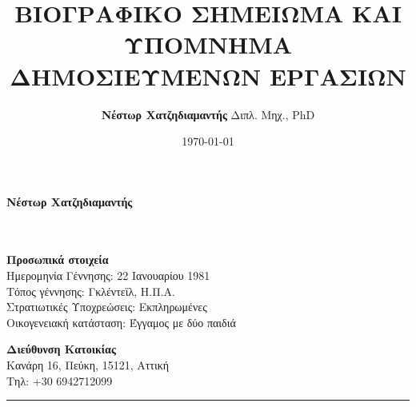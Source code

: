 \documentclass[11pt]{article}
\begin{document}
\setcounter{page}{0}
\thispagestyle{empty}
\makeatletter
\def\maketitle{%
  \null
  \thispagestyle{empty}%
  \vfill
  \begin{center}\leavevmode
    \normalfont
    \vskip 4cm
    {\huge \@title\par}%
    \vskip 1.4cm
    {\Large \@author\par}
    \vskip 1.02cm
    {\Large \@location\par}%
    \vskip 0.02cm
    {\Large \@CHA\par}%
    \vskip 6cm
    {\LARGE \@date\par}%
  \end{center}%
  \vfill
  \null
  \cleardoublepage
  }
  \def\location#1{\def\@location{#1}}
 \def\addressGOT#1{\def\@addressGOT{#1}}
 \def\CHA#1{\def\@CHA{#1}}
\makeatother

\centering \author{\Huge{\textbf{Νέστωρ Χατζηδιαμαντής}
\newline\Large {Διπλ. Μηχ., \latintext PhD}}}
\title{\textbf{\LARGE{\textbf{ΒΙΟΓΡΑΦΙΚΟ ΣΗΜΕΙΩΜΑ ΚΑΙ ΥΠΟΜΝΗΜΑ ΔΗΜΟΣΙΕΥΜΕΝΩΝ ΕΡΓΑΣΙΩΝ}}}}

\location{}
\addressGOT{}
\CHA{}
\date{\today}
\maketitle
\tableofcontents
\setcounter{tocdepth}{3}
\newpage
\noindent \begin{center}
 \textbf{\LARGE Νέστωρ Χατζηδιαμαντής}\textbf{ \vspace{2mm}
}\\
 \textbf{}\\
\textbf{}\\
\textbf{ }
\par\end{center}
\noindent
\parbox[t][0pt]{8cm}{%
\textbf{\large Προσωπικά στοιχεία}{\small }\\
{\small Ημερομηνία Γέννησης: 22 Ιανουαρίου 1981}\\
{\small Τόπος γέννησης: Γκλέντεϊλ, Η.Π.Α.}\\
{\small Στρατιωτικές Υποχρεώσεις: Εκπληρωμένες}\\
{\small Οικογενειακή κατάσταση: Έγγαμος με δύο παιδιά}{\vspace*{1mm}
}
} \hfill{}%
\parbox[t][0pt]{7.5cm}{%
\textbf{\large Διεύθυνση Κατοικίας}{\small }\\
{\small}Κανάρη 16,
{\small Πεύκη, 15121, Αττική}\\
{\small Τηλ: +30 6942712099}\\
}
\noindent \rule[-1.1in]{6.5in}{1pt}
\end{document}
